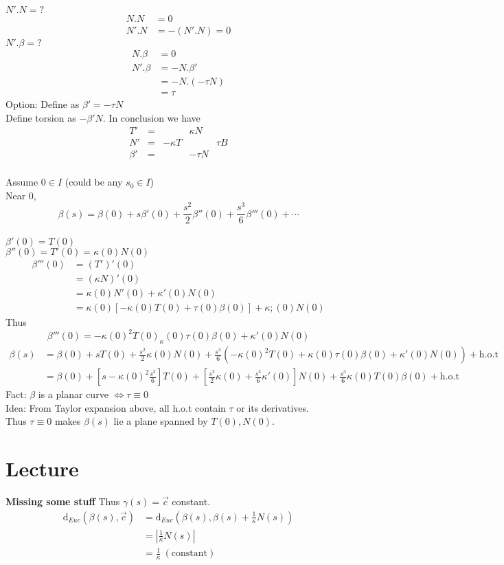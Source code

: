 \documentclass{article}
\let\ddd\cdots
\renewcommand{\d}{\mathrm{d}}
\theoremstyle{definition}
\theoremstyle{remark}
\theoremstyle{example}
\begin{document}
	$N'.N=?$
	\begin{align*}
		N.N&=0\\
		N'.N&=-(N'.N)=0
	\end{align*}
	$N'.\beta=?$
	\begin{align*}
		N.\beta&=0\\
		N'.\beta&=-N.\beta'\\
		&=-N.(-\tau N)\\
		&= \tau
	\end{align*}
	Option: Define as $\beta'=-\tau N$\\
	Define torsion as $-\beta'N$.
	In conclusion we have \[\begin{matrix}
		T'&=&& \kappa N\\
		N'&=&-\kappa T& & \tau B\\
		\beta' & =& & -\tau N
	\end{matrix}\]\\
	Assume $0 \in I$ (could be any $s_0 \in I$)\\
	Near 0, \[\beta(s)=\beta(0)+s \beta'(0)+ \frac{s^2}{2}\beta''(0) + \frac{s^3}{6}\beta'''(0) + \ddd \]\\
	$\beta'(0)=T(0)$\\
	$\beta''(0)=T'(0)=\kappa(0)N(0)$
	\begin{align*}
		\beta'''(0)&=(T')'(0)\\
		&=(\kappa N)'(0)\\
		& = \kappa(0) N'(0)+\kappa'(0)N(0)\\
		& = \kappa(0) \left[-\kappa(0)T(0)+\tau(0)\beta(0)\right]+\kappa;(0)N(0)
	\end{align*}
	Thus \[\beta'''(0)=-\kappa(0)^2T(0)_\kappa(0)\tau(0)\beta(0)+\kappa'(0)N(0)\]
	\begin{align*}
		\beta(s)&=\beta(0)+sT(0)+\frac{s^2}{2}\kappa(0)N(0)+\frac{s^3}{6}(-\kappa(0)^2T(0)+\kappa(0)\tau(0)\beta(0)+\kappa'(0)N(0)) + \mathrm{h.o.t}\\
		&=\beta(0)+\left[s-\kappa(0)^2\frac{s^3}{6}\right]T(0)+\left[\frac{s^2}{2}\kappa(0)+\frac{s^3}{6}\kappa'(0)\right]N(0)+\frac{s^3}{6}\kappa(0)T(0)\beta(0)+\mathrm{h.o.t}
	\end{align*}
	Fact: $\beta$ is a planar curve $\iff \tau \equiv 0$\\
	Idea: From Taylor expansion above, all h.o.t contain $\tau$ or its derivatives.\\
	Thus $\tau \equiv 0$ makes $\beta(s)$ lie a plane spanned by $T(0),N(0)$.
	
	\section*{Lecture}
	\textbf{Missing some stuff}
	Thus $\gamma(s)=\vec{c}$ constant.\\
	\begin{align*}
		\d_{Euc}(\beta(s), \vec{c})&=\d_{Euc}(\beta(s),\beta(s)+\frac{1}{\kappa}N(s))\\
		&=\left|\frac{1}{\kappa}N(s)\right|\\
		&=\frac{1}{\kappa}\ \mathrm{(constant)}
	\end{align*}
	
\end{document}
